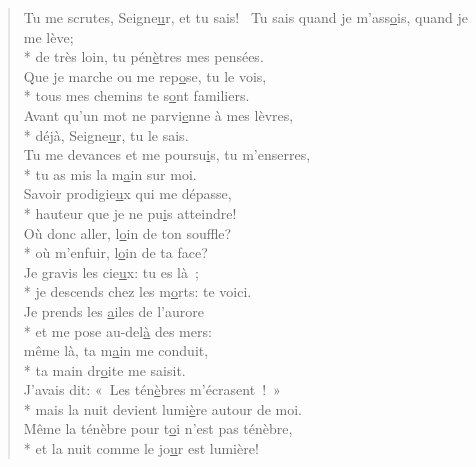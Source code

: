 
\begin{verse}
Tu me scrutes, Seigne\underline{u}r, et tu sais!~\psalmdagger
{}Tu sais quand je m’ass\underline{o}is, quand je me lève; \\*
de très loin, tu pén\underline{è}tres mes pensées. \\

Que je marche ou me rep\underline{o}se, tu le vois, \\*
tous mes chemins te s\underline{o}nt familiers. \\
Avant qu’un mot ne parvi\underline{e}nne à mes lèvres, \\*
déjà, Seigne\underline{u}r, tu le sais. \\

Tu me devances et me poursu\underline{i}s, tu m’enserres, \\*
tu as mis la m\underline{a}in sur moi. \\
Savoir prodigie\underline{u}x qui me dépasse, \\*
hauteur que je ne pu\underline{i}s atteindre! \\

Où donc aller, l\underline{o}in de ton souffle? \\*
où m’enfuir, l\underline{o}in de ta face? \\
Je gravis les cie\underline{u}x: tu es là ; \\*
je descends chez les m\underline{o}rts: te voici. \\

Je prends les \underline{a}iles de l’aurore \\*
et me pose au-del\underline{à} des mers: \\
même là, ta m\underline{a}in me conduit, \\*
ta main dr\underline{o}ite me saisit. \\

J’avais dit: « Les tén\underline{è}bres m’écrasent ! » \\*
mais la nuit devient lumi\underline{è}re autour de moi. \\
Même la ténèbre pour t\underline{o}i n’est pas ténèbre, \\*
et la nuit comme le jo\underline{u}r est lumière! \\


\end{verse}
